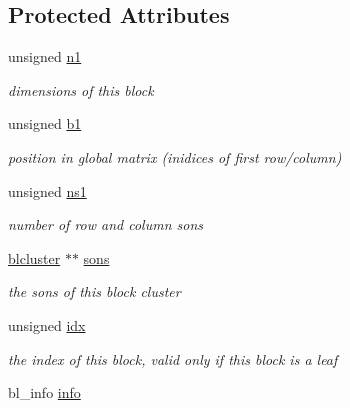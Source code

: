 \subsection*{\-Protected \-Attributes}
\begin{DoxyCompactItemize}
\item 
\hypertarget{classblcluster_ac3f85b495bb2fdee9978e20d2748c700}{
unsigned \hyperlink{classblcluster_ac3f85b495bb2fdee9978e20d2748c700}{n1}}
\label{classblcluster_ac3f85b495bb2fdee9978e20d2748c700}

\begin{DoxyCompactList}\small\item\em dimensions of this block \end{DoxyCompactList}\item 
\hypertarget{classblcluster_a54e11b9ceda6f24ae849877cdd6eac1b}{
unsigned \hyperlink{classblcluster_a54e11b9ceda6f24ae849877cdd6eac1b}{b1}}
\label{classblcluster_a54e11b9ceda6f24ae849877cdd6eac1b}

\begin{DoxyCompactList}\small\item\em position in global matrix (inidices of first row/column) \end{DoxyCompactList}\item 
\hypertarget{classblcluster_aa0f7b83b2958cb8879be9d17336031c9}{
unsigned \hyperlink{classblcluster_aa0f7b83b2958cb8879be9d17336031c9}{ns1}}
\label{classblcluster_aa0f7b83b2958cb8879be9d17336031c9}

\begin{DoxyCompactList}\small\item\em number of row and column sons \end{DoxyCompactList}\item 
\hypertarget{classblcluster_a25d49fbc00a4587a6fd302b220e98d50}{
\hyperlink{classblcluster}{blcluster} $\ast$$\ast$ \hyperlink{classblcluster_a25d49fbc00a4587a6fd302b220e98d50}{sons}}
\label{classblcluster_a25d49fbc00a4587a6fd302b220e98d50}

\begin{DoxyCompactList}\small\item\em the sons of this block cluster \end{DoxyCompactList}\item 
\hypertarget{classblcluster_a9ae8d87617d4bb44ba2c46c9384844af}{
unsigned \hyperlink{classblcluster_a9ae8d87617d4bb44ba2c46c9384844af}{idx}}
\label{classblcluster_a9ae8d87617d4bb44ba2c46c9384844af}

\begin{DoxyCompactList}\small\item\em the index of this block, valid only if this block is a leaf \end{DoxyCompactList}\item 
\hypertarget{classblcluster_a8051919e51415a68844e11e18480e5a8}{
bl\-\_\-info \hyperlink{classblcluster_a8051919e51415a68844e11e18480e5a8}{info}}
\label{classblcluster_a8051919e51415a68844e11e18480e5a8}


\end{DoxyCompactItemize}
